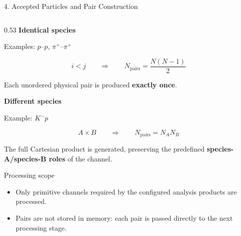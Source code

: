 \documentclass{beamer}
\begin{document}
\begin{frame}{4. Accepted Particles and Pair Construction}
\begin{columns}[T]
\begin{column}{0.53\textwidth}
\textbf{Identical species}

Examples: $p$--$p$, $\pi^+$--$\pi^+$

\vspace{-0.35em}
\[
i<j
\qquad\Longrightarrow\qquad
N_{\mathrm{pairs}}=\frac{N(N-1)}{2}
\]
\vspace{-0.45em}

Each unordered physical pair is produced \textbf{exactly once}.

\smallskip
\textbf{Different species}

Example: $K^-p$

\vspace{-0.35em}
\[
A\times B
\qquad\Longrightarrow\qquad
N_{\mathrm{pairs}}=N_A N_B
\]
\vspace{-0.45em}

The full Cartesian product is generated, preserving the predefined \textbf{species-A/species-B roles} of the channel.

\vspace{0.15em}
\begin{block}{Processing scope}
\begin{itemize}
    \setlength{\itemsep}{0.15em}
    \item Only primitive channels required by the configured analysis products are processed.
    \item Pairs are not stored in memory: each pair is passed directly to the next processing stage.
\end{itemize}
\end{block}

\end{column}

\end{columns}

\end{frame}
\end{document}
